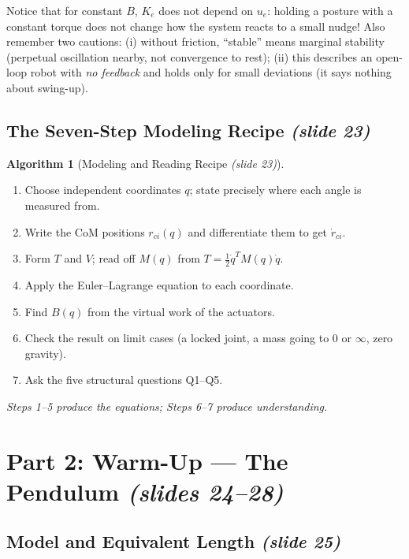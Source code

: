 \documentclass[11pt, a4paper]{article}
\theoremstyle{definition}
\newtheorem{algorithm}[definition]{Algorithm}
\theoremstyle{plain}
\begin{document}
\begin{intuition}
Notice that for constant $B$, $K_e$ does not depend on $u_e$: holding a posture with a constant torque does not change how the system reacts to a small nudge! Also remember two cautions: (i) without friction, ``stable'' means marginal stability (perpetual oscillation nearby, not convergence to rest); (ii) this describes an open-loop robot with \emph{no feedback} and holds only for small deviations (it says nothing about swing-up).
\end{intuition}

\subsection{The Seven-Step Modeling Recipe \emph{(slide 23)}}

\begin{algorithm}[Modeling and Reading Recipe \emph{(slide 23)}]
\begin{enumerate}[label=\arabic*.]
  \item Choose independent coordinates $q$; state precisely where each angle is measured from.
  \item Write the CoM positions $r_{ci}(q)$ and differentiate them to get $\dot{r}_{ci}$.
  \item Form $T$ and $V$; read off $M(q)$ from $T = \frac{1}{2}\dot{q}^T M(q)\dot{q}$.
  \item Apply the Euler--Lagrange equation to each coordinate.
  \item Find $B(q)$ from the virtual work of the actuators.
  \item Check the result on limit cases (a locked joint, a mass going to $0$ or $\infty$, zero gravity).
  \item Ask the five structural questions Q1--Q5.
\end{enumerate}
\emph{Steps 1--5 produce the equations; Steps 6--7 produce understanding.}
\end{algorithm}

\section{Part 2: Warm-Up --- The Pendulum \emph{(slides 24--28)}}

\subsection{Model and Equivalent Length \emph{(slide 25)}}
\end{document}
